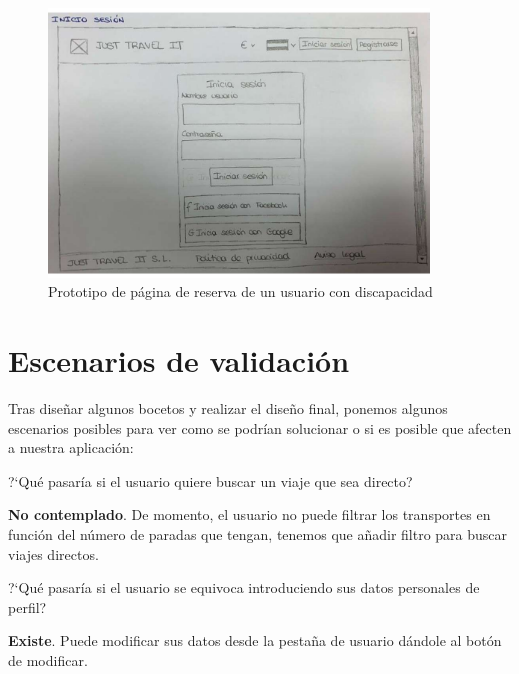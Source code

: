 \begin{figure}[H]
    \centering
    \includegraphics[page=7, width=0.9\textwidth]{./Imagenes/Prototipo/Prototipos definitivos - Iteracion I.pdf}
    \caption{Prototipo de página de reserva de un usuario con discapacidad}
    \label{fig:prot_reserva_dis}
\end{figure}

\section{Escenarios de validación}
Tras diseñar algunos bocetos y realizar el diseño final, ponemos algunos escenarios posibles para ver como se podrían solucionar o si es posible que afecten a 
nuestra aplicación:

\begin{escenario} %
      \centering
      ?`Qué pasaría si el usuario quiere buscar un viaje que sea directo?
      \begin{solucion} \centering
            \textbf{No contemplado}. De momento, el usuario no puede filtrar los transportes en función del número de paradas que tengan, tenemos que añadir filtro para buscar viajes directos.
      \end{solucion}
\end{escenario}

\begin{escenario} %
      \centering
      ?`Qué pasaría si el usuario se equivoca introduciendo sus datos personales de perfil?

      \begin{solucion} \centering
            \textbf{Existe}. Puede modificar sus datos desde la pestaña de usuario dándole al botón de modificar.
      \end{solucion}
\end{escenario}

